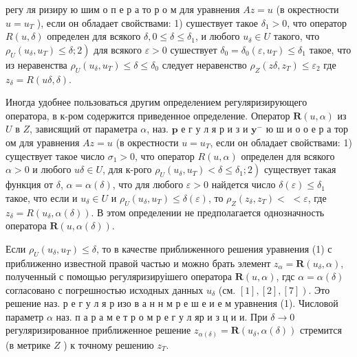 \documentclass[10pt]{article}
\begin{document}
регу ля ризиру ю шим о п е р а то р о м для уравнения $A z=u$ (в окрестности $u=u_{T}$ ), если он обладает свойствами: 1) сушествует такое $\delta_{1}>0$, что оператор $R(u, \delta)$ определен для всякого $\delta, 0 \leqslant \delta \leqslant \delta_{1}$, и любого $u_{\delta} \in U$ такого, что $\left.\rho_{U}\left(u_{\delta}, u_{T}\right) \leqslant \delta ; 2\right)$ для всякого $\varepsilon>0$ сушествует $\delta_{0}=\delta_{0}\left(\varepsilon, u_{T}\right) \leqslant \delta_{1}$ такое, что из неравенства $\rho_{U}\left(u_{\delta}, u_{T}\right) \leqslant \delta \leqslant \delta_{0}$ следует неравенство $\rho_{Z}\left(z \delta, z_{T}\right) \leqslant \varepsilon_{2}$ где $z_{\delta}=R(u \delta, \delta)$.



Иногда удобнее пользоваться другим определением регуляризирующего оператора, в к-ром содержится приведенное определение. Оператор $\boldsymbol{R}(u, \alpha)$ из $U$ в $Z$, зависящий от параметра $\alpha$, наз. $\mathbf{p}$ е г у л я р и з и $\mathbf{y}^{-}$ ю ш и о о е р а тор ом для уравнения $A z=u$ (в окрестности $u=u_{T}$, если он обладает свойствами: 1) существует такое число $\sigma_{1}>0$, что оператор $R(u, \alpha)$ определен для всякого $\alpha>0$ и любого $u \delta \in U$, для к-рого $\left.\rho_{U}\left(u_{\delta}, u_{T}\right)<\delta \leqslant \delta_{1} ; 2\right)$ существует такая функция от $\delta$, $\alpha=\alpha(\delta)$, что для любого $\varepsilon>0$ найдется число $\delta(\varepsilon) \leqslant \delta_{1}$ такое, что если и $u_{\delta} \in U$ и $\rho_{U}\left(u_{\delta}, u_{T}\right) \leqslant \delta(\varepsilon)$, то $\rho_{Z}\left(z_{\delta}, z_{T}\right)<$ $<\varepsilon$, где $z_{\delta}=R\left(u_{\delta}, \alpha(\delta)\right)$. В этом определении не предполагается однозначность оператора $\boldsymbol{R}(u, \alpha(\delta))$.



Если $\rho_{U}\left(u_{\delta}, u_{T}\right) \leqslant \delta$, то в качестве приближенного решения уравнения (1) с приближенно известной правой частью и можно брать элемент $z_{\alpha}=\boldsymbol{R}\left(u_{\delta}, \alpha\right)$, полученный с помощью регуляризируішего оператора $\boldsymbol{R}(u, \alpha)$, гдс $\alpha=\alpha(\delta)$ согласовано с погрешностью исходных данных $u_{\delta}$ (см. $\left.[1],[2],[7]\right)$. Это решение наз. р е г у л я р изо в а н н м р е ш е и е м уравнения (1). Числовой параметр $\alpha$ наз. п а р а м е т р о м р е г у л яр и з ц и и. При $\delta \rightarrow 0$ регуляризированное приближенное решение $z_{\alpha(\delta)}=\boldsymbol{R}\left(u_{\delta}, \alpha(\delta)\right)$ стремится (в метрике $Z$ ) к точному решению $z_{T}$.
\end{document}
